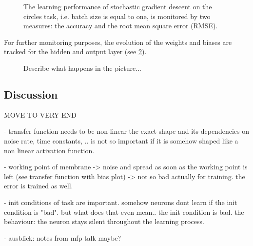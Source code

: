 \begin{figure}
	\label{circles_acc}
	\begin{center}
		
	\end{center}
	\caption{The learning performance of stochastic gradient descent on the circles task, i.e. batch size is equal to one, is monitored by two measures: the accuracy and the root mean square error (RMSE).}
\end{figure}

For further monitoring purposes, the evolution of the weights and biases are tracked for the hidden and output layer (see \cref{network_monitoring}).
\begin{figure}
	\centering
	\label{network_monitoring}
    
	\caption{Describe what happens in the picture...}
\end{figure}

\subsection{Discussion}
MOVE TO VERY END

- transfer function needs to be non-linear the exact shape and its dependencies on noise rate, time constants, .. is not so important if it is somehow shaped like a non linear activation function.

- working point of membrane -> noise and spread as soon as the working point is left (see transfer function with bias plot) -> not so bad actually for training. the error is trained as well. 

- init conditions of task are important. somehow neurons dont learn if the init condition is "bad". but what does that even  mean.. the init condition is bad. the behaviour: the neuron stays silent throughout the learning process. 

- ausblick: notes from mfp talk maybe?